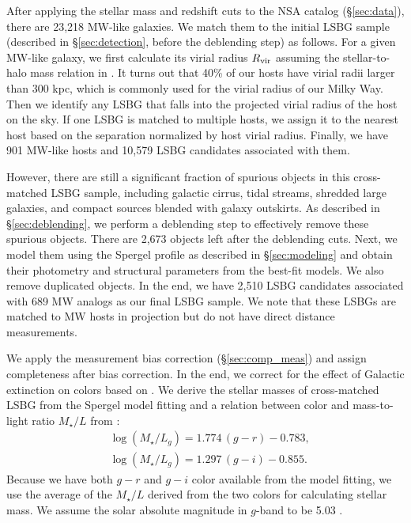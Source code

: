 \documentclass[twocolumn,astrosymb,twocolappendix]{aastex631}
\begin{document}
\begin{CJK*}{UTF8}{gbsn}
After applying the stellar mass and redshift cuts to the NSA catalog (\S\ref{sec:data}), there are 23,218 MW-like galaxies. We match them to the initial LSBG sample (described in \S \ref{sec:detection}, before the deblending step) as follows. For a given MW-like galaxy, we first calculate its virial radius $R_{\rm vir}$ assuming the stellar-to-halo mass relation in \citet{Behroozi2010}. It turns out that 40\% of our hosts have virial radii larger than 300 kpc, which is commonly used for the virial radius of our Milky Way. Then we identify any LSBG that falls into the projected virial radius of the host on the sky. If one LSBG is matched to multiple hosts, we assign it to the nearest host based on the separation normalized by host virial radius. Finally, we have 901 MW-like hosts and 10,579 LSBG candidates associated with them. 

However, there are still a significant fraction of spurious objects in this cross-matched LSBG sample, including galactic cirrus, tidal streams, shredded large galaxies, and compact sources blended with galaxy outskirts. As described in \S\ref{sec:deblending}, we perform a deblending step to effectively remove these spurious objects. There are 2,673 objects left after the deblending cuts. Next, we model them using the Spergel profile as described in \S\ref{sec:modeling} and obtain their photometry and structural parameters from the best-fit models. 
We also remove duplicated objects. In the end, we have 2,510 LSBG candidates associated with 689 MW analogs as our final LSBG sample. We note that these LSBGs are matched to MW hosts in projection but do not have direct distance measurements. 

We apply the measurement bias correction (\S \ref{sec:comp_meas}) and assign completeness after bias correction. In the end, we correct for the effect of Galactic extinction on colors based on \citet{SFD1998,Schlafly2011}. We derive the stellar masses of cross-matched LSBG from the Spergel model fitting and a relation between color and mass-to-light ratio $M_{\star}/L$ from \citet{Into2013}:
\begin{align*}
&\log \left(M_{\star} / L_{g}\right)=1.774\,(g-r)-0.783, \\
&\log \left(M_{\star} / L_{g}\right)=1.297\,(g-i)-0.855.
\end{align*}
Because we have both $g-r$ and $g-i$ color available from the model fitting, we use the average of the $M_{\star}/L$ derived from the two colors for calculating stellar mass. We assume the solar absolute magnitude in $g$-band to be 5.03 \citep{Willmer2018}. 


\end{CJK*}
\end{document}

